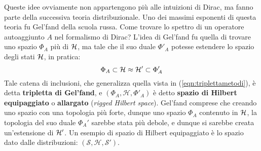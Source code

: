 \documentclass[../../FisicaTeorica.tex]{subfiles}
\begin{document}
Queste idee ovviamente non appartengono più alle intuizioni di Dirac, ma fanno parte della successiva teoria distribuzionale. Uno dei massimi esponenti di questa teoria fu Gel'fand della scuola russa. Come trovare lo spettro di un operatore autoaggiunto $A$ nel formalismo di Dirac? L'idea di Gel'fand fu quella di trovare uno spazio $\Phi_A$ più  di $\mathcal{H}$, ma tale che il suo duale $\Phi'_A$ potesse estendere lo spazio degli stati $\mathcal{H}$, in pratica:
\begin{equation}
\Phi_A \subset \mathcal{H} \approx \mathcal{H}' \subset \Phi_A'
\label{tripletta-gelfand}
\end{equation}
Tale catena di inclusioni, che generalizza quella vista in (\ref{eqn:triplettametodi}), è detta \textbf{tripletta di Gel'fand}, e $(\Phi_A, \mathcal{H}, \Phi'_A)$ è detto \textbf{spazio di Hilbert equipaggiato} o \textbf{allargato} (\textit{rigged Hilbert space}). Gel'fand comprese che creando uno spazio con una topologia più forte, dunque uno spazio $\Phi_A$ contenuto in $\mathcal{H}$, la topologia del suo duale $\Phi_A'$ sarebbe stata più debole, e dunque si sarebbe creata un'estensione di $\mathcal{H}'$. Un esempio di spazio di Hilbert equipaggiato è lo spazio dato dalle distribuzioni: $(\mathcal{S}, \mathcal{H}, \mathcal{S}')$.
\end{document}
